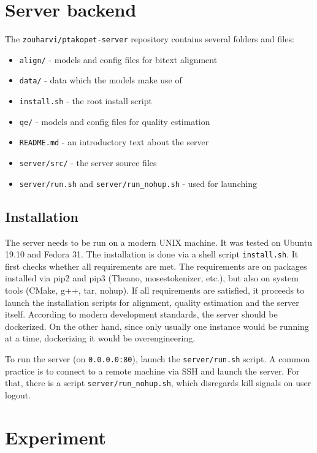 \pagebreak

\section{Server backend}

The \texttt{zouharvi/ptakopet-server} repository contains several folders and files:

\begin{itemize}
    \item \texttt{align/} - models and config files for bitext alignment
    \item \texttt{data/} - data which the models make use of
    \item \texttt{install.sh} - the root install script
    \item \texttt{qe/} - models and config files for quality estimation
    \item \texttt{README.md} - an introductory text about the server
    \item \texttt{server/src/} - the server source files
    \item \texttt{server/run.sh} and \texttt{server/run\_nohup.sh} - used for launching
\end{itemize}

\subsection{Installation}

The server needs to be run on a modern UNIX machine. It was tested on Ubuntu 19.10 and Fedora 31. The installation is done via a shell script \texttt{install.sh}. It first checks whether all requirements are met. The requirements are on packages installed via pip2 and pip3 (Theano, mosestokenizer, etc.), but also on system tools (CMake, g++, tar, nohup). If all requirements are satisfied, it proceeds to launch the installation scripts for alignment, quality estimation and the server itself. According to modern development standards, the server should be dockerized. On the other hand, since only usually one instance would be running at a time, dockerizing it would be overengineering.

To run the server (on \texttt{0.0.0.0:80}), launch the \texttt{server/run.sh} script. A common practice is to connect to a remote machine via SSH and launch the server. For that, there is a script \texttt{server/run\_nohup.sh}, which disregards kill signals on user logout.

\pagebreak
\section{Experiment} \label{sec:dev_doc:experiment}

